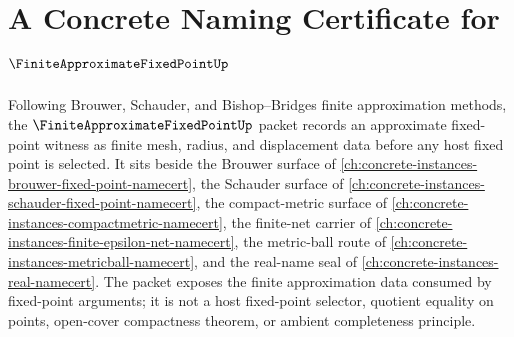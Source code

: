 \chapter{A Concrete Naming Certificate for $\FiniteApproximateFixedPointUp$}
\label{ch:concrete-instances-finite-approximate-fixed-point-namecert}

Following Brouwer, Schauder, and Bishop--Bridges finite approximation methods, the $\FiniteApproximateFixedPointUp$ packet records an approximate fixed-point witness as finite mesh, radius, and displacement data before any host fixed point is selected. It sits beside the Brouwer surface of \autoref{ch:concrete-instances-brouwer-fixed-point-namecert}, the Schauder surface of \autoref{ch:concrete-instances-schauder-fixed-point-namecert}, the compact-metric surface of \autoref{ch:concrete-instances-compactmetric-namecert}, the finite-net carrier of \autoref{ch:concrete-instances-finite-epsilon-net-namecert}, the metric-ball route of \autoref{ch:concrete-instances-metricball-namecert}, and the real-name seal of \autoref{ch:concrete-instances-real-namecert}. The packet exposes the finite approximation data consumed by fixed-point arguments; it is not a host fixed-point selector, quotient equality on points, open-cover compactness theorem, or ambient completeness principle.

